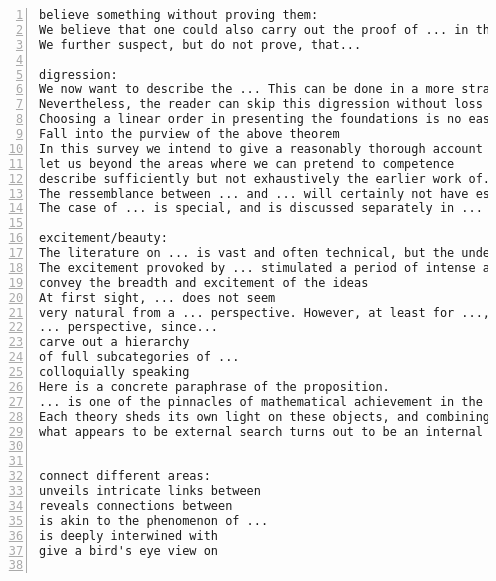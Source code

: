 \documentclass[11pt]{amsart}
\begin{document}
\begin{lstlisting}[numbers=left,numberstyle=\tiny,numbersep=10pt]
believe something without proving them:
We believe that one could also carry out the proof of ... in the language of ..., but we  have not investigated the details.
We further suspect, but do not prove, that...

digression:
We now want to describe the ... This can be done in a more straightforward way, but we prefer to include a short digression in ... theory as this allows us to mention a general fact which is in the background of a later construction anyhow.
Nevertheless, the reader can skip this digression without loss of continuity and continue with ... instead.
Choosing a linear order in presenting the foundations is no easy task.
Fall into the purview of the above theorem
In this survey we intend to give a reasonably thorough account of the recent work, though mostly without detailed proofs
let us beyond the areas where we can pretend to competence
describe sufficiently but not exhaustively the earlier work of...
The ressemblance between ... and ... will certainly not have escaped the reader's sagacity.
The case of ... is special, and is discussed separately in ...

excitement/beauty:
The literature on ... is vast and often technical, but the underlying ideas are possessing of an undeniable beauty.
The excitement provoked by ... stimulated a period of intense and widespread activity.
convey the breadth and excitement of the ideas
At first sight, ... does not seem
very natural from a ... perspective. However, at least for ..., ... is important from
... perspective, since...
carve out a hierarchy
of full subcategories of ...
colloquially speaking
Here is a concrete paraphrase of the proposition.
... is one of the pinnacles of mathematical achievement in the 20th century.
Each theory sheds its own light on these objects, and combining the various perspectives is likely to be very fruitful.
what appears to be external search turns out to be an internal search


connect different areas:
unveils intricate links between
reveals connections between
is akin to the phenomenon of ...
is deeply interwined with
give a bird's eye view on


\end{lstlisting}
\end{document}
